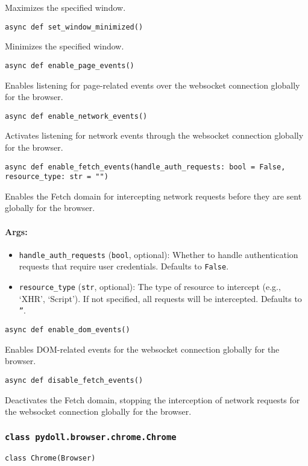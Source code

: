 \documentclass{article}
\begin{document}
\noindent Maximizes the specified window.

\noindent\texttt{async def set\_window\_minimized()}

\noindent Minimizes the specified window.

\noindent\texttt{async def enable\_page\_events()}

\noindent Enables listening for page-related events over the websocket connection globally for the browser.

\noindent\texttt{async def enable\_network\_events()}

\noindent Activates listening for network events through the websocket connection globally for the browser.

\noindent\texttt{async def enable\_fetch\_events(handle\_auth\_requests: bool = False, resource\_type: str = "")}

\noindent Enables the Fetch domain for intercepting network requests before they are sent globally for the browser.

\paragraph{Args:}
\begin{itemize}
    \item \texttt{handle\_auth\_requests} (\texttt{bool}, optional): Whether to handle authentication requests that require user credentials. Defaults to \texttt{False}.
    \item \texttt{resource\_type} (\texttt{str}, optional): The type of resource to intercept (e.g., `XHR', `Script'). If not specified, all requests will be intercepted. Defaults to \texttt{''}.
\end{itemize}

\noindent\texttt{async def enable\_dom\_events()}

\noindent Enables DOM-related events for the websocket connection globally for the browser.

\noindent\texttt{async def disable\_fetch\_events()}

\noindent Deactivates the Fetch domain, stopping the interception of network requests for the websocket connection globally for the browser.

\subsubsection*{\texttt{class pydoll.browser.chrome.Chrome}}
\noindent\texttt{class Chrome(Browser)}
\end{document}
